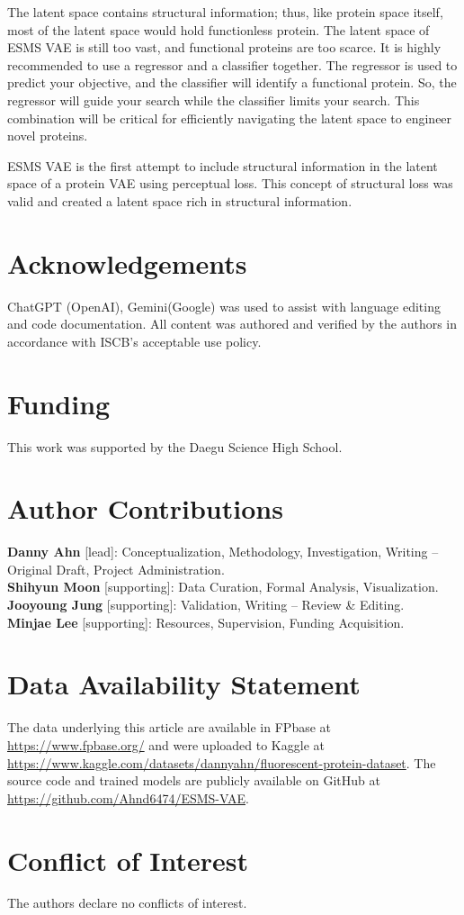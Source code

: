 \documentclass[unnumsec,webpdf,contemporary,medium]{oup-authoring-template}
\begin{document}
The latent space contains structural information; thus, like protein space itself, most of the latent space would hold functionless protein. The latent space of ESMS VAE is still too vast, and functional proteins are too scarce. It is highly recommended to use a regressor and a classifier together. The regressor is used to predict your objective, and the classifier will identify a functional protein. So, the regressor will guide your search while the classifier limits your search. This combination will be critical for efficiently navigating the latent space to engineer novel proteins.


ESMS VAE is the first attempt to include structural information in the latent space of a protein VAE using perceptual loss. This concept of structural loss was valid and created a latent space rich in structural information.

\section*{Acknowledgements}
ChatGPT (OpenAI), Gemini(Google) was used to assist with language editing and code documentation. All content was authored and verified by the authors in accordance with ISCB’s acceptable use policy.

\section*{Funding}
This work was supported by the Daegu Science High School.

\section*{Author Contributions}

\textbf{Danny Ahn} [lead]: Conceptualization, Methodology, Investigation, Writing – Original Draft, Project Administration.\\
\textbf{Shihyun Moon} [supporting]: Data Curation, Formal Analysis, Visualization.\\
\textbf{Jooyoung Jung} [supporting]: Validation, Writing – Review \& Editing.\\
\textbf{Minjae Lee} [supporting]: Resources, Supervision, Funding Acquisition.


\section*{Data Availability Statement}
The data underlying this article are available in FPbase at \href{https://www.fpbase.org/}{https://www.fpbase.org/} and were uploaded to Kaggle at \href{https://www.kaggle.com/datasets/dannyahn/fluorescent-protein-dataset}{https://www.kaggle.com/datasets/dannyahn/fluorescent-protein-dataset}. The source code and trained models are publicly available on GitHub at \href{https://github.com/Ahnd6474/ESMS-VAE}{https://github.com/Ahnd6474/ESMS-VAE}.

\section*{Conflict of Interest}
The authors declare no conflicts of interest.


\end{document}
